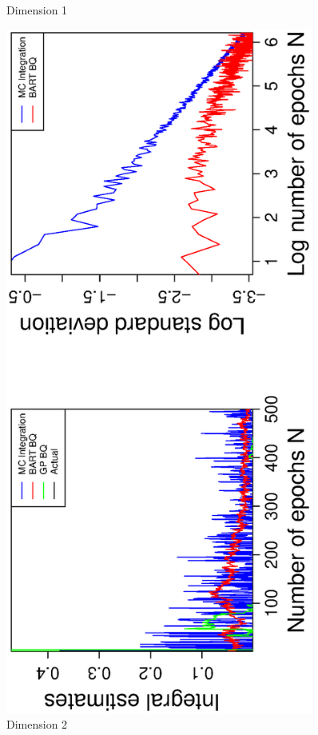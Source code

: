 \begin{figure}[H]
\begin{minipage}[b]{0.4\textwidth}
     \vspace{-1cm}
     \caption{Dimension 1}
  \end{minipage}
    \hspace{1.5cm}
  \begin{minipage}[b]{0.4\textwidth}
    \includegraphics[width= 0.9\textwidth, angle = -90]{report/Figures/5/convergenceMean52Dimensions.eps}
    \vspace{-1cm}
    \caption{Dimension 2}
  \end{minipage}
\end{figure}
\vspace{-1cm}

